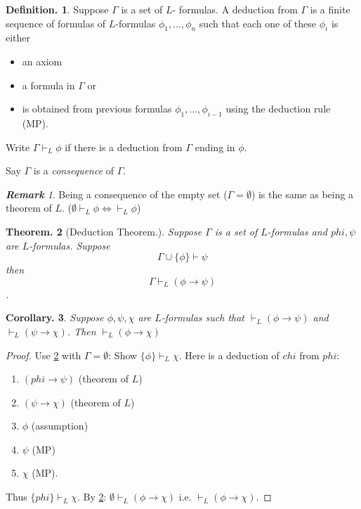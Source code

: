 \documentclass[a4paper,oneside,11pt,DIV=12,parskip=half]{scrartcl}
\theoremstyle{plain}
\newtheorem{theorem}{Theorem.}[section]
\newtheorem{corollary}[theorem]{Corollary.}
\theoremstyle{definition}
\newtheorem{definition}[theorem]{Definition.}
\newtheorem{remark, definition}[theorem]{Remark and Definition.}
\newtheorem{lemma, definition}[theorem]{Lemma and Definition.}
\newtheorem{theorem, definition}[theorem]{Theorem and Definition.}
\theoremstyle{remark}
\newtheorem*{remark}{\textbf{Remark}}
\newtheorem*{remark, example}{\textbf{Remark and Exercise}}
\begin{document}
\begin{definition}

Suppose $\Gamma$ is a set of $L$- formulas. A deduction from $\Gamma$ is a finite sequence of formulas of $L$-formulas $\phi_1,\dots,\phi_n$ such that each one of these $\phi_i$ is either
\begin{itemize}
    \item an axiom
    \item a formula in $\Gamma$ or
    \item is obtained from previous formulas $\phi_1,\dots,\phi_{i-1}$ using the deduction rule (MP).
\end{itemize}
Write $\Gamma \vdash_L \phi$ if there is a deduction from $\Gamma$ ending in $\phi$.

Say $\Gamma$ is a \emph{consequence} of $\Gamma$.
\end{definition}

\begin{remark}
Being a consequence of the empty set ($\Gamma = \emptyset$) is the same as being a theorem of $L$. ($\emptyset \vdash_L \phi \Leftrightarrow \vdash_L \phi$)
\end{remark}

\begin{theorem}[Deduction Theorem.]\label{Th:deduction}
Suppose $\Gamma$ is a set of $L$-formulas and $phi,\psi$ are $L$-formulas. Suppose
    \[ \Gamma \cup \{\phi\} \vdash \psi \] then
    \[ \Gamma \vdash_L (\phi \rightarrow \psi) \].
\end{theorem}

\begin{corollary}
Suppose $\phi,\psi,\chi$ are $L$-formulas such that $ \vdash_L (\phi \rightarrow \psi)$ and $ \vdash_L (\psi \rightarrow \chi)$. Then $ \vdash_L (\phi \rightarrow \chi)$
\end{corollary}

\begin{proof}
Use \ref{Th:deduction} with $\Gamma = \emptyset$: Show $\{\phi\} \vdash_L \chi$. Here is a deduction of $chi$ from $phi$:
\begin{enumerate}
    \item $(phi \rightarrow \psi)$ (theorem of $L$)
    \item $(\psi \rightarrow \chi)$ (theorem of $L$)
    \item $\phi$ (assumption)
    \item $\psi$ (MP)
    \item $\chi$ (MP).
\end{enumerate}
Thus $\{phi\} \vdash_L \chi$.
By \ref{Th:deduction}: $\emptyset \vdash_L (\phi \rightarrow \chi)$ i.e. $ \vdash_L (\phi \rightarrow \chi) $.
\end{proof}
\end{document}
